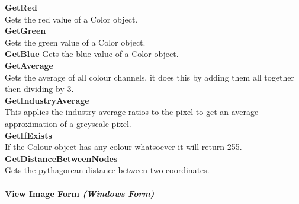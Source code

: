 \begin{FlushLeft}
    \textbf{GetRed} \\ \bk
    Gets the red value of a Color object.\\\bk
    \textbf{GetGreen} \\ \bk
    Gets the green value of a Color object.\\\bk
    \textbf{GetBlue}
    Gets the blue value of a Color object.\\\bk
    \textbf{GetAverage} \\ \bk
    Gets the average of all colour channels, it does this by adding them all together then dividing by 3.\\\bk
    \textbf{GetIndustryAverage} \\ \bk
    This applies the industry average ratios to the pixel to get an average approximation of a greyscale pixel.\\\bk
    \textbf{GetIfExists} \\ \bk
    If the Colour object has any colour whatsoever it will return 255.\\\bk
    \textbf{GetDistanceBetweenNodes} \\ \bk
    Gets the pythagorean distance between two coordinates.\\

    \bk

    \pagebreak
\paragraph{View Image Form \textit{(Windows Form)}} \mbox{} \\

    \begin{figure}[H]
        \centering
    \end{figure}\\


\end{FlushLeft}
